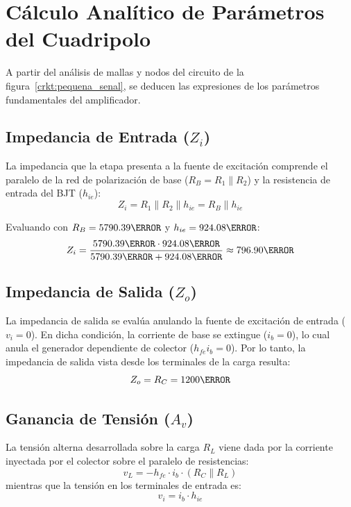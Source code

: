\section{Cálculo Analítico de Parámetros del Cuadripolo}

A partir del análisis de mallas y nodos del circuito de la figura~\ref{crkt:pequena_senal}, se deducen las expresiones
de los parámetros fundamentales del amplificador.

\subsection{Impedancia de Entrada (\texorpdfstring{$Z_i$}{Zi})}
La impedancia que la etapa presenta a la fuente de excitación comprende el paralelo de la red de polarización de base
($R_B = R_1 \parallel R_2$) y la resistencia de entrada del BJT ($h_{ie}$):
\begin{equation}
  Z_i = R_1 \parallel R_2 \parallel h_{ie} = R_B \parallel h_{ie}
  \label{eq:Zi_formula}
\end{equation}

Evaluando con $R_B = 5790.39\ohm$ y $h_{ie} = 924.08\ohm$:
\begin{equation}
  Z_i = \frac{5790.39\ohm \cdot 924.08\ohm}{5790.39\ohm + 924.08\ohm} \approx 796.90\ohm
  \label{eq:Zi_teorica}
\end{equation}

\subsection{Impedancia de Salida (\texorpdfstring{$Z_o$}{Zo})}
La impedancia de salida se evalúa anulando la fuente de excitación de entrada ($v_i = 0$). En dicha condición, la
corriente de base se extingue ($i_b = 0$), lo cual anula el generador dependiente de colector ($h_{fe} i_b = 0$).
Por lo tanto, la impedancia de salida vista desde los terminales de la carga resulta:
\begin{equation}
  Z_o = R_C = 1200\ohm
  \label{eq:Zo_teorica}
\end{equation}

\subsection{Ganancia de Tensión (\texorpdfstring{$A_v$}{Av})}
La tensión alterna desarrollada sobre la carga $R_L$ viene dada por la corriente inyectada por el colector sobre el
paralelo de resistencias:
\begin{equation}
  v_L = -h_{fe} \cdot i_b \cdot (R_C \parallel R_L)
\end{equation}
mientras que la tensión en los terminales de entrada es:
\begin{equation}
  v_i = i_b \cdot h_{ie}
\end{equation}

